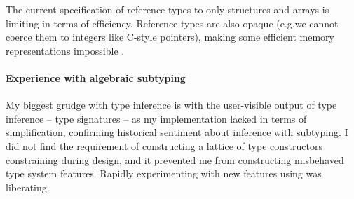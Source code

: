 The current specification of reference types to only structures and arrays is limiting in terms of efficiency. Reference types are also opaque (e.g.\@ we cannot coerce them to integers like C-style pointers), making some efficient memory representations impossible \cite{double-ended-bit-stealing}.

\paragraph{Experience with algebraic subtyping} My biggest grudge with type inference is with the user-visible output of type inference -- type signatures -- as my implementation lacked in terms of simplification, confirming historical sentiment about inference with subtyping. I did not find the requirement of constructing a lattice of type constructors constraining during design, and it prevented me from constructing misbehaved type system features. Rapidly experimenting with new features using \inference{} was liberating.
